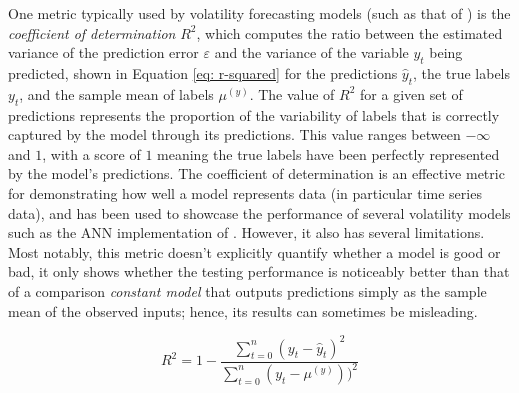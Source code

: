 \documentclass[a4paper, 11pt]{report}
\begin{document}
    One metric typically used by volatility forecasting models (such as that of \citet{zhang-2022}) is the \emph{coefficient of determination} $R^2$, which computes the ratio between the estimated variance of the prediction error $\varepsilon$ and the variance of the variable $y_t$ being predicted, shown in Equation \ref{eq: r-squared} for the predictions $\hat{y}_t$, the true labels $y_t$, and the sample mean of labels $\mu^{(y)}$. The value of $R^2$ for a given set of predictions represents the proportion of the variability of labels that is correctly captured by the model through its predictions. This value ranges between $- \infty$ and $1$, with a score of $1$ meaning the true labels have been perfectly represented by the model's predictions. The coefficient of determination is an effective metric for demonstrating how well a model represents data (in particular time series data), and has been used to showcase the performance of several volatility models such as the ANN implementation of \citet{zhang-2022}. However, it also has several limitations. Most notably, this metric doesn't explicitly quantify whether a model is good or bad, it only shows whether the testing performance is noticeably better than that of a comparison \emph{constant model} that outputs predictions simply as the sample mean of the observed inputs; hence, its results can sometimes be misleading.


    \begin{equation}
        \label{eq: r-squared}
        R^2 = 1 - \frac{\sum_{t=0}^n (y_t - \hat{y}_t)^2}{\sum_{t=0}^n (y_t - \mu^{(y)}))^2}
    \end{equation}
\end{document}
